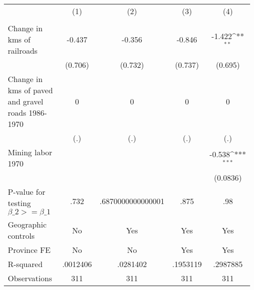 {
\def\sym#1{\ifmmode^{#1}\else\(^{#1}\)\fi}
\begin{tabular}{l*{4}{c}}
\hline\hline
                &\multicolumn{1}{c}{(1)}&\multicolumn{1}{c}{(2)}&\multicolumn{1}{c}{(3)}&\multicolumn{1}{c}{(4)}\\
                &\multicolumn{1}{c}{}&\multicolumn{1}{c}{}&\multicolumn{1}{c}{}&\multicolumn{1}{c}{}\\
\hline
Change in kms of railroads&   -0.437         &   -0.356         &   -0.846         &   -1.422\sym{**} \\
                &  (0.706)         &  (0.732)         &  (0.737)         &  (0.695)         \\
[1em]
Change in kms of paved and gravel roads 1986-1970&        0         &        0         &        0         &        0         \\
                &      (.)         &      (.)         &      (.)         &      (.)         \\
[1em]
Mining labor 1970&                  &                  &                  &   -0.538\sym{***}\\
                &                  &                  &                  & (0.0836)         \\
\hline
P-value for testing $\beta\_{2} >= \beta\_{1}$&     .732         &.6870000000000001         &     .875         &      .98         \\
Geographic controls&       No         &      Yes         &      Yes         &      Yes         \\
Province FE     &       No         &       No         &      Yes         &      Yes         \\
R-squared       & .0012406         & .0281402         & .1953119         & .2987885         \\
Observations    &      311         &      311         &      311         &      311         \\
\hline\hline
\end{tabular}
}
